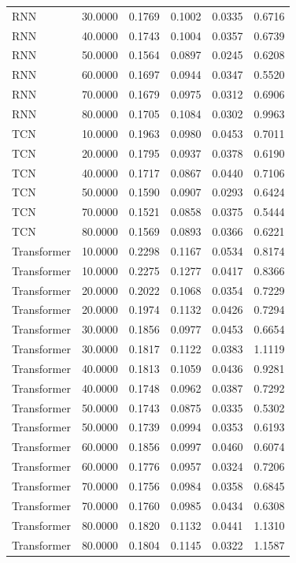 \begin{tabular}{lrrrrr}
RNN & 30.0000 & 0.1769 & 0.1002 & 0.0335 & 0.6716 \\
RNN & 40.0000 & 0.1743 & 0.1004 & 0.0357 & 0.6739 \\
RNN & 50.0000 & 0.1564 & 0.0897 & 0.0245 & 0.6208 \\
RNN & 60.0000 & 0.1697 & 0.0944 & 0.0347 & 0.5520 \\
RNN & 70.0000 & 0.1679 & 0.0975 & 0.0312 & 0.6906 \\
RNN & 80.0000 & 0.1705 & 0.1084 & 0.0302 & 0.9963 \\
TCN & 10.0000 & 0.1963 & 0.0980 & 0.0453 & 0.7011 \\
TCN & 20.0000 & 0.1795 & 0.0937 & 0.0378 & 0.6190 \\
TCN & 40.0000 & 0.1717 & 0.0867 & 0.0440 & 0.7106 \\
TCN & 50.0000 & 0.1590 & 0.0907 & 0.0293 & 0.6424 \\
TCN & 70.0000 & 0.1521 & 0.0858 & 0.0375 & 0.5444 \\
TCN & 80.0000 & 0.1569 & 0.0893 & 0.0366 & 0.6221 \\
Transformer & 10.0000 & 0.2298 & 0.1167 & 0.0534 & 0.8174 \\
Transformer & 10.0000 & 0.2275 & 0.1277 & 0.0417 & 0.8366 \\
Transformer & 20.0000 & 0.2022 & 0.1068 & 0.0354 & 0.7229 \\
Transformer & 20.0000 & 0.1974 & 0.1132 & 0.0426 & 0.7294 \\
Transformer & 30.0000 & 0.1856 & 0.0977 & 0.0453 & 0.6654 \\
Transformer & 30.0000 & 0.1817 & 0.1122 & 0.0383 & 1.1119 \\
Transformer & 40.0000 & 0.1813 & 0.1059 & 0.0436 & 0.9281 \\
Transformer & 40.0000 & 0.1748 & 0.0962 & 0.0387 & 0.7292 \\
Transformer & 50.0000 & 0.1743 & 0.0875 & 0.0335 & 0.5302 \\
Transformer & 50.0000 & 0.1739 & 0.0994 & 0.0353 & 0.6193 \\
Transformer & 60.0000 & 0.1856 & 0.0997 & 0.0460 & 0.6074 \\
Transformer & 60.0000 & 0.1776 & 0.0957 & 0.0324 & 0.7206 \\
Transformer & 70.0000 & 0.1756 & 0.0984 & 0.0358 & 0.6845 \\
Transformer & 70.0000 & 0.1760 & 0.0985 & 0.0434 & 0.6308 \\
Transformer & 80.0000 & 0.1820 & 0.1132 & 0.0441 & 1.1310 \\
Transformer & 80.0000 & 0.1804 & 0.1145 & 0.0322 & 1.1587 \\
\bottomrule
\end{tabular}
